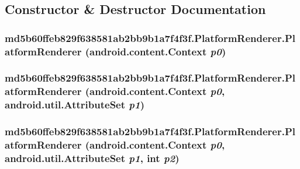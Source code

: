 \subsection{Constructor \& Destructor Documentation}
\hypertarget{classmd5b60ffeb829f638581ab2bb9b1a7f4f3f_1_1_platform_renderer_90bfbb67da58b02ff0166542312af648}{
\subsubsection[{PlatformRenderer}]{\setlength{\rightskip}{0pt plus 5cm}md5b60ffeb829f638581ab2bb9b1a7f4f3f.PlatformRenderer.PlatformRenderer (android.content.Context {\em p0})}}
\label{classmd5b60ffeb829f638581ab2bb9b1a7f4f3f_1_1_platform_renderer_90bfbb67da58b02ff0166542312af648}


\hypertarget{classmd5b60ffeb829f638581ab2bb9b1a7f4f3f_1_1_platform_renderer_90fc0b6b4826200382896057d7702f7c}{
\subsubsection[{PlatformRenderer}]{\setlength{\rightskip}{0pt plus 5cm}md5b60ffeb829f638581ab2bb9b1a7f4f3f.PlatformRenderer.PlatformRenderer (android.content.Context {\em p0}, \/  android.util.AttributeSet {\em p1})}}
\label{classmd5b60ffeb829f638581ab2bb9b1a7f4f3f_1_1_platform_renderer_90fc0b6b4826200382896057d7702f7c}


\hypertarget{classmd5b60ffeb829f638581ab2bb9b1a7f4f3f_1_1_platform_renderer_8177f3eb1c1c90d64ec568241b38a443}{
\subsubsection[{PlatformRenderer}]{\setlength{\rightskip}{0pt plus 5cm}md5b60ffeb829f638581ab2bb9b1a7f4f3f.PlatformRenderer.PlatformRenderer (android.content.Context {\em p0}, \/  android.util.AttributeSet {\em p1}, \/  int {\em p2})}}
\label{classmd5b60ffeb829f638581ab2bb9b1a7f4f3f_1_1_platform_renderer_8177f3eb1c1c90d64ec568241b38a443}


